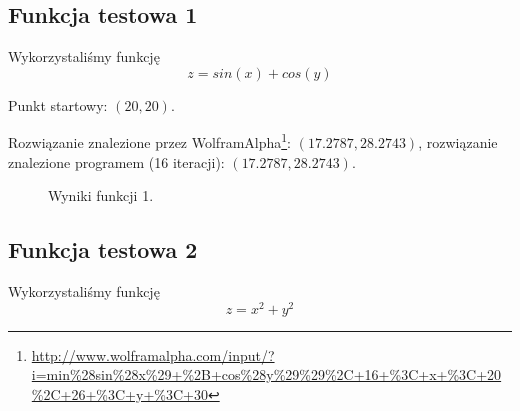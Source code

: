 \documentclass{classrep}
\begin{document}
\subsection{Funkcja testowa 1}
Wykorzystaliśmy funkcję
\begin{equation}
  z = sin(x) + cos(y)
\end{equation}

Punkt startowy: $(20, 20)$.

Rozwiązanie znalezione przez WolframAlpha\footnote{\url{http://www.wolframalpha.com/input/?i=min\%28sin\%28x\%29+\%2B+cos\%28y\%29\%29\%2C+16+\%3C+x+\%3C+20\%2C+26+\%3C+y+\%3C+30}}: $(17.2787, 28.2743)$, rozwiązanie znalezione programem (16 iteracji): $(17.2787, 28.2743)$.

\begin{figure}
\noindent{}
\caption{Wyniki funkcji 1.}
\end{figure}

\subsection{Funkcja testowa 2}
Wykorzystaliśmy funkcję
\begin{equation}
  z = x^2 + y^2
\end{equation}
\end{document}
